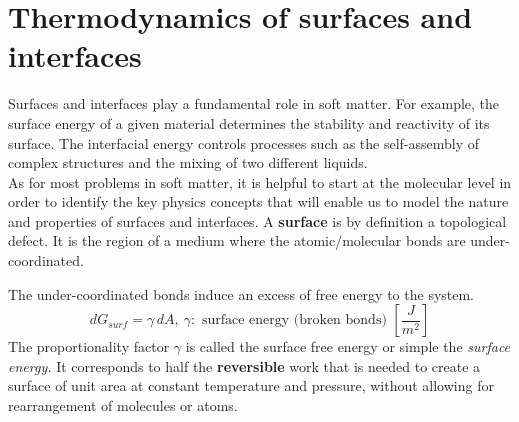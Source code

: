 \documentclass[a4paper, 11pt, normalem]{report}
\begin{document}
\section{Thermodynamics of surfaces and interfaces}
Surfaces and interfaces play a fundamental role in soft matter.
For example, the surface energy of a given material determines the stability and reactivity of its surface.
The interfacial energy controls processes such as the self-assembly of complex structures and the mixing of two different liquids. \\
As for most problems in soft matter, it is helpful to start at the molecular level in order to identify the key physics concepts that will enable us to model the nature and properties of surfaces and interfaces.
A \textbf{surface} is by definition a topological defect.
It is the region of a medium where the atomic/molecular bonds are under-coordinated.
\begin{figure}[H]
    \centering
\end{figure}
The under-coordinated bonds induce an excess of free energy to the system.
\begin{equation}
    dG_{surf} = \gamma\,dA,~ \gamma:\text{ surface energy (broken bonds) }\left[\frac{J}{m^2}\right]
\end{equation}
The proportionality factor $\gamma$ is called the surface free energy or simple the \textit{surface energy.}
It corresponds to half the \textbf{reversible} work that is needed to create a surface of unit area at constant temperature and pressure, without allowing for rearrangement of molecules or atoms.
\end{document}
